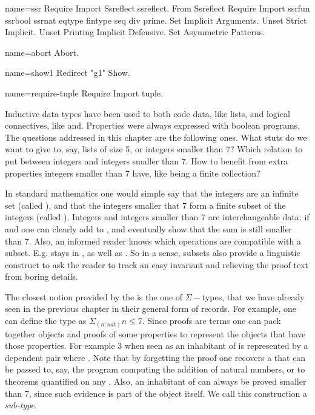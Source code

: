 \begin{coqdef}{name=ssr}
Require Import Ssreflect.ssreflect.
From Ssreflect Require Import ssrfun ssrbool ssrnat eqtype fintype seq div prime.
Set Implicit Arguments.
Unset Strict Implicit.
Unset Printing Implicit Defensive.
Set Asymmetric Patterns.
\end{coqdef}
\begin{coqdef}{name=abort}
Abort.
\end{coqdef}
\begin{coqdef}{name=show1}
Redirect "g1" Show.
\end{coqdef}
\begin{coqdef}{name=require-tuple}
Require Import tuple.
\end{coqdef}

\label{ch:sigmabool}

Inductive data types have been used to both code data, like lists, and
logical connectives, like and.  Properties were always expressed with
boolean programs.  The questions addressed in this chapter are the
following ones.  What
stuts do we want to give to, say, lists of size 5,  or integers
smaller than 7?  Which relation to put between integers and
integers smaller than 7.  How to benefit from extra properties
integers smaller than 7 have, like being a finite collection?

In standard mathematics one would simple say that the integers are an
infinite set (called ), and that the integers smaller that 7
form a finite subset of the integers (called ).  Integers and
integers smaller than 7 are interchangeable data: if  and
 one can clearly add  to , and eventually show
that the sum is still smaller than 7.  Also, an informed reader
knows which operations are compatible with a subset. E.g. 
stays in , as well as .  So in a sense, subsets
also provide a linguistic construct to ask the reader to track an
easy invariant and relieving the proof text from boring details.

The closest notion provided by the \mcbCIC{} is the one of $\Sigma-$types,
that we have already seen in the previous chapter in their general
form of records.
For example, one can define the type  as $\Sigma_{(n:nat)} n
\leq 7$.  Since proofs are terms one can 
pack together objects and proofs of some properties to
represent the objects that have those properties.  For example $3$
when seen as an inhabitant of  is represented by a dependent
pair  where .  Note that by forgetting the
proof  one recovers a  that can be passed to, say, the
program computing the addition of natural numbers, or to theorems
quantified on any .  Also, an inhabitant of  can always
be proved smaller than 7, since such evidence is part of the
object itself.
We call this construction a \emph{sub-type}.

